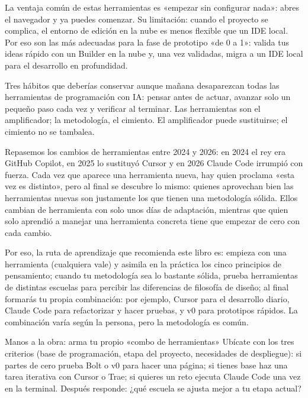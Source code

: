 La ventaja común de estas herramientas es «empezar sin configurar nada»: abres el navegador y ya puedes comenzar. Su limitación: cuando el proyecto se complica, el entorno de edición en la nube es menos flexible que un IDE local. Por eso son las más adecuadas para la fase de prototipo «de 0 a 1»: valida tus ideas rápido con un Builder en la nube y, una vez validadas, migra a un IDE local para el desarrollo en profundidad.


Tres hábitos que deberías conservar aunque mañana desaparezcan todas las herramientas de programación con IA: pensar antes de actuar, avanzar solo un pequeño paso cada vez y verificar al terminar. Las herramientas son el amplificador; la metodología, el cimiento. El amplificador puede sustituirse; el cimiento no se tambalea.

Repasemos los cambios de herramientas entre 2024 y 2026: en 2024 el rey era GitHub Copilot, en 2025 lo sustituyó Cursor y en 2026 Claude Code irrumpió con fuerza. Cada vez que aparece una herramienta nueva, hay quien proclama «esta vez es distinto», pero al final se descubre lo mismo: quienes aprovechan bien las herramientas nuevas son justamente los que tienen una metodología sólida. Ellos cambian de herramienta con solo unos días de adaptación, mientras que quien solo aprendió a manejar una herramienta concreta tiene que empezar de cero con cada cambio.

Por eso, la ruta de aprendizaje que recomienda este libro es: empieza con una herramienta (cualquiera vale) y asimila en la práctica los cinco principios de pensamiento; cuando tu metodología sea lo bastante sólida, prueba herramientas de distintas escuelas para percibir las diferencias de filosofía de diseño; al final formarás tu propia combinación: por ejemplo, Cursor para el desarrollo diario, Claude Code para refactorizar y hacer pruebas, y v0 para prototipos rápidos. La combinación varía según la persona, pero la metodología es común.

\begin{tcbpractice}{Manos a la obra: arma tu propio «combo de herramientas»}
Ubícate con los tres criterios (base de programación, etapa del proyecto, necesidades de despliegue): si partes de cero prueba Bolt o v0 para hacer una página; si tienes base haz una tarea iterativa con Cursor o Trae; si quieres un reto ejecuta Claude Code una vez en la terminal. Después responde: ¿qué escuela se ajusta mejor a tu etapa actual?

\end{tcbpractice}

